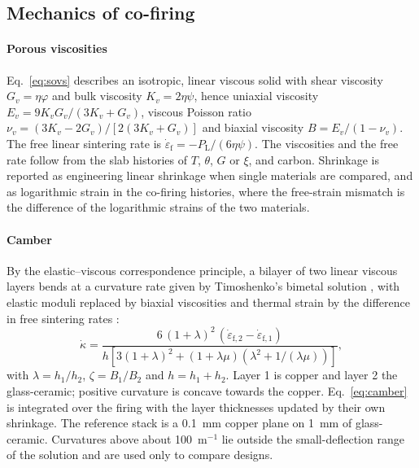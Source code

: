 \subsection{Mechanics of co-firing}
\label{sec:mechanics}

\paragraph{Porous viscosities} Eq.~\eqref{eq:sovs} describes an isotropic, linear viscous solid with shear viscosity $G_v = \eta\varphi$ and bulk viscosity $K_v = 2\eta\psi$, hence uniaxial viscosity $E_v = 9K_vG_v/(3K_v+G_v)$, viscous Poisson ratio $\nu_v = (3K_v-2G_v)/[2(3K_v+G_v)]$ and biaxial viscosity $B = E_v/(1-\nu_v)$. The free linear sintering rate is $\dot{\varepsilon}_{\mathrm{f}} = -P_{\mathrm{L}}/(6\eta\psi)$. The viscosities and the free rate follow from the slab histories of $T$, $\theta$, $G$ or $\xi$, and carbon. Shrinkage is reported as engineering linear shrinkage when single materials are compared, and as logarithmic strain in the co-firing histories, where the free-strain mismatch is the difference of the logarithmic strains of the two materials.

\paragraph{Camber} By the elastic--viscous correspondence principle, a bilayer of two linear viscous layers bends at a curvature rate given by Timoshenko's bimetal solution \cite{timoshenko1925analysis}, with elastic moduli replaced by biaxial viscosities and thermal strain by the difference in free sintering rates \cite{cai1997constrainedII,jean1997cofiring,olevsky2013sintering}:
\begin{equation}
\dot{\kappa} = \frac{6\,(1+\lambda)^2\,\left(\dot{\varepsilon}_{\mathrm{f},2}-\dot{\varepsilon}_{\mathrm{f},1}\right)}{h\left[3(1+\lambda)^2+(1+\lambda\mu)\left(\lambda^2+1/(\lambda\mu)\right)\right]},
\label{eq:camber}
\end{equation}
with $\lambda = h_1/h_2$, $\zeta = B_1/B_2$ and $h = h_1 + h_2$. Layer 1 is copper and layer 2 the glass-ceramic; positive curvature is concave towards the copper. Eq.~\eqref{eq:camber} is integrated over the firing with the layer thicknesses updated by their own shrinkage. The reference stack is a 0.1~mm copper plane on 1~mm of glass-ceramic. Curvatures above about 100~m$^{-1}$ lie outside the small-deflection range of the solution and are used only to compare designs.

